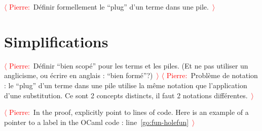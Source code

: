 \documentclass[a4paper]{article}
\newcommand{\TODO}[1]{\textcolor{red}{$\langle$ Pierre:}~#1\textcolor{red}{~$\rangle$}}
\begin{document}
\TODO{Définir formellement le ``plug'' d'un terme dans une pile.}

\section{Simplifications}

\TODO{Définir ``bien scopé'' pour les terms et les piles. (Et ne pas utiliser un anglicisme, ou écrire en anglais : ``bien formé''?)}
\TODO{Problème de notation : le ``plug'' d'un terme dans une pile utilise la même notation que l'application d'une substitution. Ce sont 2 concepts distincts, il faut 2 notations différentes.}

\TODO{In the proof, explicitly point to lines of code. Here is an
  example of a pointer to a label in the OCaml code :
  line~\ref{go:fun-holefun}}
\end{document}
